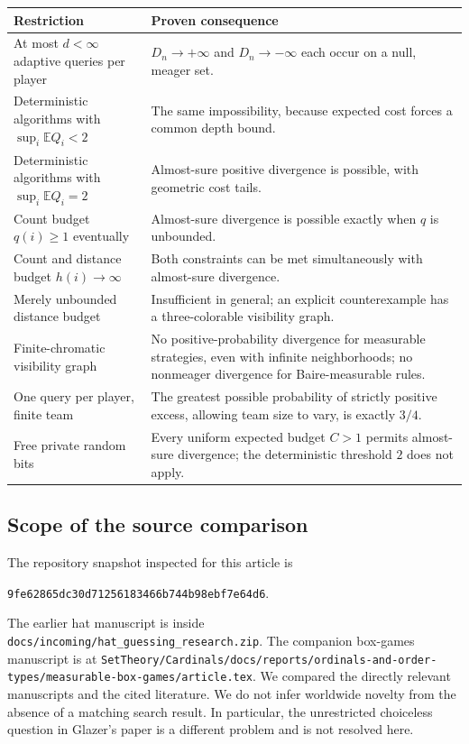 \documentclass[11pt,letterpaper]{article}
\theoremstyle{definition}
\newcommand{\E}{\mathbb E}
\newcommand{\qrypin}{9fe62865dc30d71256183466b744b98ebf7e64d6}
\begin{document}
\begin{longtable}{>{\raggedright\arraybackslash}p{}
 >{\raggedright\arraybackslash}p{}}
\toprule
Restriction & Proven consequence\\
\midrule
\endhead
At most \(d<\infty\) adaptive queries per player &
\(D_n\to+\infty\) and \(D_n\to-\infty\) each occur on a null, meager set.\\
\addlinespace
Deterministic algorithms with \(\sup_i\E Q_i<2\) &
The same impossibility, because expected cost forces a common depth bound.\\
\addlinespace
Deterministic algorithms with \(\sup_i\E Q_i=2\) &
Almost-sure positive divergence is possible, with geometric cost tails.\\
\addlinespace
Count budget \(q(i)\ge1\) eventually &
Almost-sure divergence is possible exactly when \(q\) is unbounded.\\
\addlinespace
Count and distance budget \(h(i)\to\infty\) &
Both constraints can be met simultaneously with almost-sure divergence.\\
\addlinespace
Merely unbounded distance budget &
Insufficient in general; an explicit counterexample has a three-colorable
visibility graph.\\
\addlinespace
Finite-chromatic visibility graph &
No positive-probability divergence for measurable strategies, even with
infinite neighborhoods; no nonmeager divergence for Baire-measurable rules.\\
\addlinespace
One query per player, finite team &
The greatest possible probability of strictly positive excess, allowing
team size to vary, is exactly \(3/4\).\\
\addlinespace
Free private random bits &
Every uniform expected budget \(C>1\) permits almost-sure divergence;
the deterministic threshold \(2\) does not apply.\\
\bottomrule
\end{longtable}

\subsection{Scope of the source comparison}

The repository snapshot inspected for this article is
\begin{center}
\small\texttt{\qrypin}.
\end{center}
The earlier hat manuscript is inside
\nolinkurl{docs/incoming/hat_guessing_research.zip}.
The companion box-games manuscript is at
\nolinkurl{SetTheory/Cardinals/docs/reports/ordinals-and-order-types/measurable-box-games/article.tex}.
We compared the directly relevant manuscripts and the cited literature.
We do not infer worldwide novelty from the absence of a matching search
result. In particular, the unrestricted choiceless question in
Glazer's paper is a different problem and is not resolved here.
\end{document}
